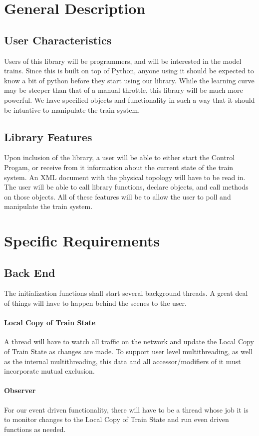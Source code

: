 \documentclass[a4paper,11pt,notitlepage]{article}
\def\CS{Control Progam\xspace}
\def\LC{Local Copy of Train State\xspace}
\begin{document}
\newpage
\section{General Description}
\subsection{User Characteristics}
Users of this library will be programmers, and will be interested in the model trains. Since this is built on top of Python, anyone using it should be expected to know a bit of python before they start using our library. While the learning curve may be steeper than that of a manual throttle, this library will be much more powerful. We have specified objects and functionality in such a way that it should be intuative to manipulate the train system.
\subsection{Library Features}
Upon inclusion of the library, a user will be able to either start the \CS, or receive from it information about the current state of the train system. An XML document with the physical topology will have to be read in. The user will be able to call library functions, declare objects, and call methods on those objects. All of these features will be to allow the user to poll and manipulate the train system.

\newpage
\section{Specific Requirements}
\subsection{Back End}
The initialization functions shall start several background threads. A great deal of things will have to happen behind the scenes to the user.
\paragraph{\LC} A thread will have to watch all traffic on the network and update the \LC as changes are made. To support user level multithreading, as well as the internal multithreading, this data and all accessor/modifiers of it must incorporate mutual exclusion.
\paragraph{Observer} For our event driven functionality, there will have to be a thread whose job it is to monitor changes to the \LC and run even driven functions as needed.
\end{document}
